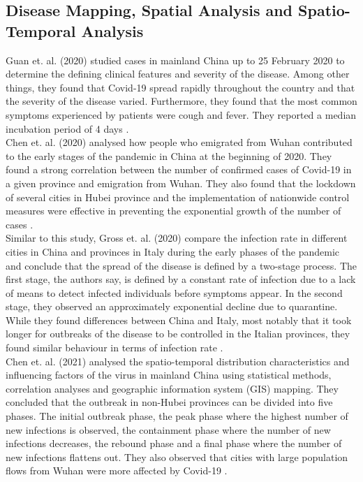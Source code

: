 \subsection*{Disease Mapping, Spatial Analysis and Spatio-Temporal Analysis}
Guan et. al. (2020) studied cases in mainland China up to 25 February 2020 to determine the defining clinical features and severity of the disease. Among other things, they found that Covid-19 spread rapidly throughout the country and that the severity of the disease varied. Furthermore, they found that the most common symptoms experienced by patients were cough and fever. They reported a median incubation period of 4 days \autocite[][]{guan2020clinical}. \\
Chen et. al. (2020) analysed how people who emigrated from Wuhan contributed to the early stages of the pandemic in China at the beginning of 2020. They found a strong correlation between the number of confirmed cases of Covid-19 in a given province and emigration from Wuhan. They also found that the lockdown of several cities in Hubei province and the implementation of nationwide control measures were effective in preventing the exponential growth of the number of cases \autocite[][]{chen2020distribution}. \\
Similar to this study, Gross et. al. (2020) compare the infection rate in different cities in China and provinces in Italy during the early phases of the pandemic and conclude that the spread of the disease is defined by a two-stage process. The first stage, the authors say, is defined by a constant rate of infection due to a lack of means to detect infected individuals before symptoms appear. In the second stage, they observed an approximately exponential decline due to quarantine. While they found differences between China and Italy, most notably that it took longer for outbreaks of the disease to be controlled in the Italian provinces, they found similar behaviour in terms of infection rate \autocite[][]{gross2020spatio}. \\
Chen et. al. (2021) analysed the spatio-temporal distribution characteristics and influencing factors of the virus in mainland China using statistical methods, correlation analyses and geographic information system (GIS) mapping. They concluded that the outbreak in non-Hubei provinces can be divided into five phases. The initial outbreak phase, the peak phase where the highest number of new infections is observed, the containment phase where the number of new infections decreases, the rebound phase and a final phase where the number of new infections flattens out. They also observed that cities with large population flows from Wuhan were more affected by Covid-19 \autocite[][]{chen2021spatio}. \\
